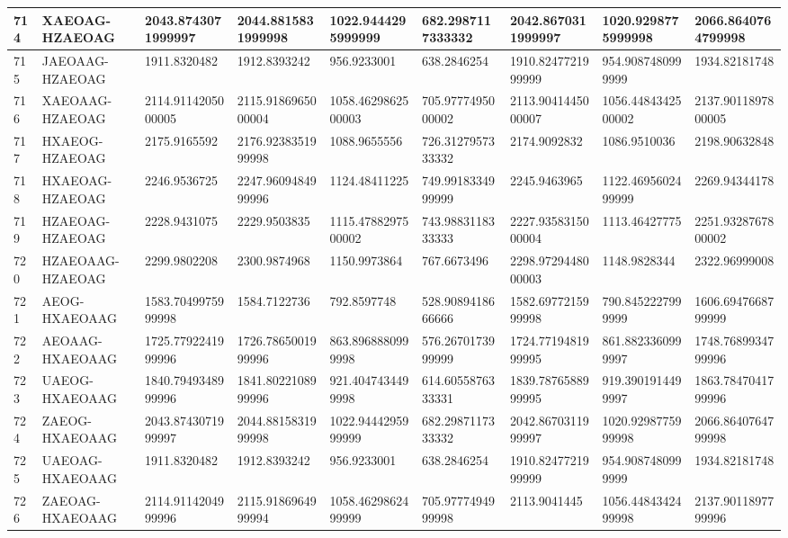 {\begin{longtable}{|l|l|l|l|l|l|l|l|l|}
        714 & XAEOAG-HZAEOAG & 2043.8743071999997 & 2044.8815831999998 & 1022.9444295999999 & 682.2987117333332 & 2042.8670311999997 & 1020.9298775999998 & 2066.8640764799998 \\ \hline
        715 & JAEOAAG-HZAEOAG & 1911.8320482 & 1912.8393242 & 956.9233001 & 638.2846254 & 1910.8247721999999 & 954.9087480999999 & 1934.82181748 \\ \hline
        716 & XAEOAAG-HZAEOAG & 2114.9114205000005 & 2115.9186965000004 & 1058.4629862500003 & 705.9777495000002 & 2113.9041445000007 & 1056.4484342500002 & 2137.9011897800005 \\ \hline
        717 & HXAEOG-HZAEOAG & 2175.9165592 & 2176.9238351999998 & 1088.9655556 & 726.3127957333332 & 2174.9092832 & 1086.9510036 & 2198.90632848 \\ \hline
        718 & HXAEOAG-HZAEOAG & 2246.9536725 & 2247.9609484999996 & 1124.48411225 & 749.9918334999999 & 2245.9463965 & 1122.4695602499999 & 2269.94344178 \\ \hline
        719 & HZAEOAG-HZAEOAG & 2228.9431075 & 2229.9503835 & 1115.4788297500002 & 743.9883118333333 & 2227.9358315000004 & 1113.46427775 & 2251.9328767800002 \\ \hline
        720 & HZAEOAAG-HZAEOAG & 2299.9802208 & 2300.9874968 & 1150.9973864 & 767.6673496 & 2298.9729448000003 & 1148.9828344 & 2322.96999008 \\ \hline
        721 & AEOG-HXAEOAAG & 1583.7049975999998 & 1584.7122736 & 792.8597748 & 528.9089418666666 & 1582.6977215999998 & 790.8452227999999 & 1606.6947668799999 \\ \hline
        722 & AEOAAG-HXAEOAAG & 1725.7792241999996 & 1726.7865001999996 & 863.8968880999998 & 576.2670173999999 & 1724.7719481999995 & 861.8823360999997 & 1748.7689934799996 \\ \hline
        723 & UAEOG-HXAEOAAG & 1840.7949348999996 & 1841.8022108999996 & 921.4047434499998 & 614.6055876333331 & 1839.7876588999995 & 919.3901914499997 & 1863.7847041799996 \\ \hline
        724 & ZAEOG-HXAEOAAG & 2043.8743071999997 & 2044.8815831999998 & 1022.9444295999999 & 682.2987117333332 & 2042.8670311999997 & 1020.9298775999998 & 2066.8640764799998 \\ \hline
        725 & UAEOAG-HXAEOAAG & 1911.8320482 & 1912.8393242 & 956.9233001 & 638.2846254 & 1910.8247721999999 & 954.9087480999999 & 1934.82181748 \\ \hline
        726 & ZAEOAG-HXAEOAAG & 2114.9114204999996 & 2115.9186964999994 & 1058.4629862499999 & 705.9777494999998 & 2113.9041445 & 1056.4484342499998 & 2137.9011897799996 \\ \hline

\end{longtable}}
